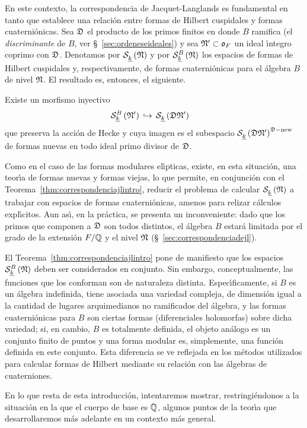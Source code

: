 En este contexto, la correspondencia de Jacquet-Langlands es fundamental en
tanto que establece una relaci\'{o}n entre formas de Hilbert cuspidales y
formas cuaterni\'{o}nicas. Sea $\frak{D}$ el producto de los primos finitos en
donde $B$ ramifica (el \emph{discriminante} de $B$, ver
\S~\ref{sec:ordeneseideales}) y sea $\frak{N}'\subset\oka{F}$ un ideal
\'{\i}ntegro coprimo con $\frak{D}$. Denotamos por $\spitzH{k}{\frak{N}}$ y por
$\spitzH[B]{k}{\frak{N}}$ los espacios de formas de Hilbert cuspidales y,
respectivamente, de formas cuaterni\'{o}nicas para el \'{a}lgebra $B$ de nivel
$\frak{N}$. El resultado es, entonces, el siguiente.
%
\begin{teoJacquetLanglandsIntro}%
	\label{thm:correspondenciajlintro}
	Existe un morfismo inyectivo
	\begin{align*}
		& \spitzH[B]{k}{\frak{N}'}\,
			\hookrightarrow\,\spitzH{k}{\frak{D}\frak{N}'}
	\end{align*}
	que preserva la acci\'{o}n de Hecke y cuya imagen es el subespacio
	$\spitzH{k}{\frak{D}\frak{N}'}^{\frak{D}-\neue}$ de formas nuevas en
	todo ideal primo divisor de $\frak{D}$.
\end{teoJacquetLanglandsIntro}
%
Como en el caso de las formas modulares el\'{\i}pticas, existe, en esta
situaci\'{o}n, una teor\'{\i}a de formas nuevas y formas viejas, lo que
permite, en conjunci\'{o}n con el Teorema~\ref{thm:correspondenciajlintro},
reducir el problema de calcular $\spitzH{k}{\frak{N}}$ a trabajar con espacios
de formas cuaterni\'{o}nicas, amenos para relizar c\'{a}lculos expl\'{\i}citos.
Aun as\'{\i}, en la pr\'{a}ctica, se presenta un inconveniente: dado que los
primos que componen a $\frak{D}$ son todos distintos, el \'{a}lgebra $B$
estar\'{a} limitada por el grado de la extensi\'{o}n $F/\bb{Q}$ y el nivel
$\frak{N}$ (\S~\ref{sec:correspondenciadejl}).

El Teorema~\ref{thm:correspondenciajlintro} pone de manifiesto que los espacios
$\spitzH[B]{k}{\frak{N}}$ deben ser considerados en conjunto. Sin embargo,
conceptualmente, las funciones que los conforman son de naturaleza distinta.
Espec\'{\i}ficamente, si $B$ es un \'{a}lgebra indefinida, tiene asociada una
variedad compleja, de dimensi\'{o}n igual a la cantidad de lugares
arquimedianos no ramificados del \'{a}lgebra, y las formas cuaterni\'{o}nicas
para $B$ son ciertas formas (diferenciales holomorfas) sobre dicha variedad;
si, en cambio, $B$ es totalmente definida, el objeto an\'{a}logo es un conjunto
finito de puntos y una forma modular es, simplemente, una funci\'{o}n definida
en este conjunto. Esta diferencia se ve reflejada en los m\'{e}todos utilizados
para calcular formas de Hilbert mediante su relaci\'{o}n con las \'{a}lgebras
de cuaterniones.

En lo que resta de esta introducci\'{o}n, intentaremos mostrar,
restringi\'{e}ndonos a la situaci\'{o}n en la que el cuerpo de base es
$\bb{Q}$, algunos puntos de la teor\'{\i}a que desarrollaremos m\'{a}s adelante
en un contexto m\'{a}s general.

